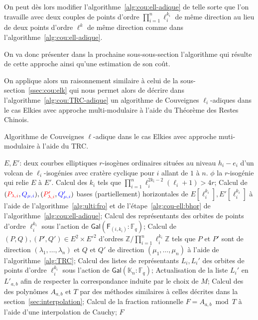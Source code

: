 \documentclass[10pt,a4paper]{book}
\theoremstyle{plain}
\theoremstyle{definition}
\theoremstyle{definition}
\theoremstyle{definition}
\theoremstyle{definition}
\theoremstyle{remark}
\theoremstyle{remark}
\theoremstyle{definition}
\begin{document}
 On peut dès lors modifier l'algorithme~\ref{alg:cou:ell-adique} de telle sorte
 que l'on travaille avec deux couples de points d'ordre 
 $\prod_{i=1}^n\ell_i^{k_i}$ de même direction au lieu de deux points d'ordre
 $\ell^k$ de même direction comme dans l'algorithme~\ref{alg:cou:ell-adique}.
 
 On va donc présenter dans la prochaine sous-sous-section l'algorithme qui résulte 
 de cette approche ainsi qu'une estimation de son coût.
 
On applique alors un raisonnement similaire à celui de la sous-
section~\ref{ssec:cou:elk} qui nous permet alors de décrire dans 
l'algorithme~\ref{alg:cou:TRC-adique} un algorithme de Couveignes 
$\ell_i$-adiques dans le cas Elkies avec approche multi-modulaire à l'aide du 
Théorème des Restes Chinois.
 
\begin{algorithm}
\caption{\label{alg:cou:TRC-adique} Algorithme de Couveignes $\ell$-adique dans le cas Elkies avec approche muti-modulaire à l'aide du TRC.}
\begin{algorithmic}[1]
\REQUIRE $E,E'$: deux courbes elliptiques $r$-isogènes ordinaires situées au niveau $h_i-e_i$ d'un volcan de $\ell_i$-isogénies avec cratère cyclique pour $i$ allant de $1$ à $n$.
\ENSURE $\phi$ la $r$-isogénie qui relie $E$ à $E'$.
\STATE Calcul des $k_i$ tels que $\prod_{i=1}^n\ell_{i}^{2k_{i}-2}(\ell_{i}+1)>4r$;
\STATE \label{alg:cou:TRC-adique:bhor} Calcul de $(\color{red}P_{\lambda,i}\color{black},\color{blue}Q_{\mu,i}\color{black}),(\color{red}P'_{\lambda,i}\color{black},\color{blue}Q_{\mu,i}'\color{black})$ bases (partiellement) horizontales de $E[\ell_i^{k_i}],E'[\ell_i^{k_i}]$ à l'aide de l'algorithme~\ref{alg:ulti:fro} et de l'étape~\ref{alg:cou-ell:bhor} de l'algorithme~\ref{alg:cou:ell-adique};
\STATE \label{alg:cou:TRC_adique:rep:uni} Calcul des représentants des orbites de points d'ordre $\ell_i^{k_i}$ sous l'action de $\mathsf{Gal}(\mathsf{F}_{(i,k_i)}:\mathbb{F}_q)$;
\ENDFOR
\STATE \label{alg:cou:TRC-adique:TRC} Calcul de $(P,Q),(P',Q') \in E^2 \times E'^2$ d'ordres $ \mathbb{Z}/\prod_{i=1}^n \ell_i^{k_i}\mathbb{Z}$ tels que $P$ et $P'$ sont de direction $(\lambda_1, \dots, \lambda_n)$ et $Q$ et $Q'$ de direction $(\mu_1, \dots, \mu_n)$ à l'aide de l'algorithme~\ref{alg:TRC};
\STATE \label{alg:cou:TRC-adique:rep} Calcul des listes de représentants $L_i,L_i'$ des orbites de points d'ordre $\ell_i^{k_i}$ sous l'action de $\mathsf{Gal}(\mathbb{K}_n:\mathbb{F}_q)$;
\STATE \label{alg:cou:TRC-adique:ord} Actualisation de la liste $L_i'$ en $L'_{a,b}$ afin de respecter la correspondance induite par le choix de $M$;
\STATE \label{alg:cou:TRC-adique:int} Calcul des des polynômes $A_{a,b}$ et $T$ par des méthodes similaires à celles décrites dans la section~\ref{sec:interpolation};
\STATE \label{alg:cou:TRC-adique:Cauchy} Calcul de la fraction rationnelle $F=A_{a,b} \bmod T$ à l'aide d'une interpolation de Cauchy;
 \label{alg:cou:TRC-adique:test}
\RETURN $F$
\ENDIF
\ENDFOR 
\end{algorithmic}
\end{algorithm}
\end{document}
